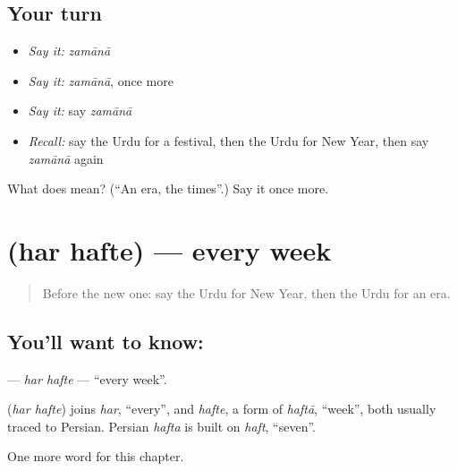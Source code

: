 \subsection*{Your turn}
\begin{itemize}
\raggedright
  \item \emph{Say it:} \emph{zamānā}
  \item \emph{Say it:} \emph{zamānā}, once more
  \item \emph{Say it:} say \emph{zamānā}
  \item \emph{Recall:} say the Urdu for a festival, then the Urdu for New Year, then say \emph{zamānā} again
\end{itemize}

\begin{tcolorbox}[breakable,colback=teal!4,colframe=teal!35!black,title={Before you move on}]
What does  mean? (\textquotedblleft{}An era, the times\textquotedblright{}.) Say it once more.
\end{tcolorbox}
\section[\texorpdfstring{\ur{ہر} \ur{ہفتے} (har hafte)}{ہر ہفتے (har hafte)}]{  (har hafte) — every week}

\label{lesson:UR-C156-har-hafte}



\begin{quote}
Before the new one: say the Urdu for New Year, then the Urdu for an era.
\end{quote}

\subsection*{You'll want to know:  }
\textbf{ } — \emph{har hafte} — \textquotedblleft{}every week\textquotedblright{}.

\begin{cousinweb}
\textbf{ } (\emph{har hafte}) joins \emph{har}, \textquotedblleft{}every\textquotedblright{}, and \emph{hafte}, a form of \emph{haftā}, \textquotedblleft{}week\textquotedblright{}, both usually traced to Persian. Persian \emph{hafta} is built on \emph{haft}, \textquotedblleft{}seven\textquotedblright{}.
\end{cousinweb}

\begin{grammarlens}[title={What you've built}]
One more word for this chapter.
\end{grammarlens}

